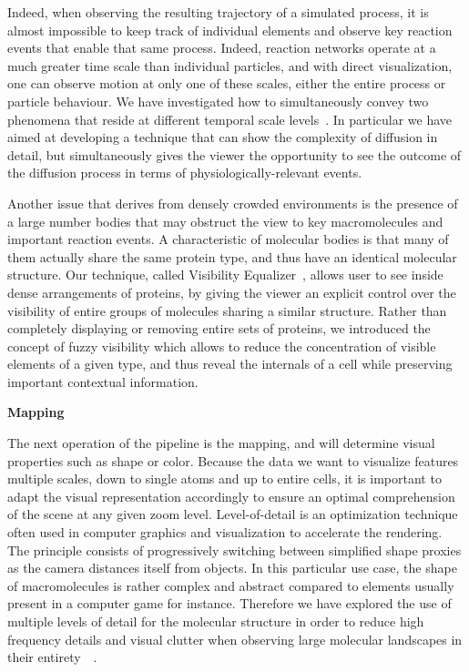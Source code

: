 Indeed, when observing the resulting trajectory of a simulated process, it is almost impossible to keep track of individual elements and observe key reaction events that enable that same process. 
Indeed, reaction networks operate at a much greater time scale than individual particles, and with direct visualization, one can observe motion at only one of these scales, either the entire process or particle behaviour.
We have investigated how to simultaneously convey two phenomena that reside at different temporal scale levels~\cite{le2015illustrative}. 
In particular we have aimed at developing a technique that can show the complexity of diffusion in detail, but simultaneously gives the viewer the opportunity to see the outcome of the diffusion process in terms of physiologically-relevant events.

Another issue that derives from densely crowded environments is the presence of a large number bodies that may obstruct the view to key macromolecules and important reaction events. 
A characteristic of molecular bodies is that many of them actually share the same protein type, and thus have an identical molecular structure.
Our technique, called Visibility Equalizer~\cite{le2016visibility}, allows user to see inside dense arrangements of proteins, by giving the viewer an explicit control over the visibility of entire groups of molecules sharing a similar structure. 
Rather than completely displaying or removing entire sets of proteins, we introduced the concept of fuzzy visibility which allows to reduce the concentration of visible elements of a given type, and thus reveal the internals of a cell while preserving important contextual information.

\textbf{Mapping}

The next operation of the pipeline is the mapping, and will determine visual properties such as shape or color.
Because the data we want to visualize features multiple scales, down to single atoms and up to entire cells, it is important to adapt the visual representation accordingly to ensure an optimal comprehension of the scene at any given zoom level.
Level-of-detail is an optimization technique often used in computer graphics and visualization to accelerate the rendering.
The principle consists of progressively switching between simplified shape proxies as the camera distances itself from objects.
In this particular use case, the shape of macromolecules is rather complex and abstract compared to elements usually present in a computer game for instance.
Therefore we have explored the use of multiple levels of detail for the molecular structure in order to reduce high frequency details and visual clutter when observing large molecular landscapes in their entirety~\cite{le2015cellview}~\cite{le2014illustrative}. 

